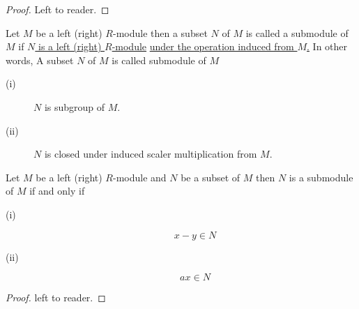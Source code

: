 \begin{proof}
	Left to reader.
\end{proof}
\bigskip
\begin{definition}[SubModule]
	Let $M$ be a left (right) $R$-module then a subset $N$ of $M$ is called a submodule of $M$ if \underline{$N$ is a left (right) $R$-module} \underline{under the operation induced from $M$.}\newline \bigskip
	In other words, A subset $N$ of $M$ is called submodule of $M$
	\begin{description}
		\item[(i)] $N$ is subgroup of $M$.
		\item[(ii)] $N$ is closed under induced scaler multiplication from $M$.
	\end{description}
\end{definition}
\bigskip
\begin{thm}
	Let $M$ be a left (right) $R$-module and $N$ be a subset of $M$ then $N$ is a submodule of $M$ if and only if 
	\begin{description}
		\item[(i)] 
		\marginnote[2.5em]{\[ \forall \ x , y  \in N \] } \[ x-y \in N \]
		\item[(ii)] 
		\marginnote[2.5em]{\[ \forall \ a \in R \ \&\ x \in N \]} \[ a x \in N \]
	\end{description}
\end{thm}
\begin{proof}
	left to reader.
\end{proof}

	
